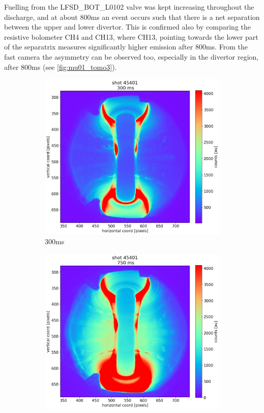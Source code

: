 Fuelling from the LFSD\_BOT\_L0102 valve was kept increasing throughout the discharge, and at about 800ms an event occurs such that there is a net separation between the upper and lower divertor. This is confirmed also by comparing the resistive bolometer CH4 and CH13, where CH13, pointing towards the lower part of the separatrix measures significantly higher emission after 800ms. From the fast camera the asymmetry can be observed too, especially in the divertor region, after 800ms (see \autoref{fig:mu01_tomo3}).
\begin{figure}
    \centering
    \begin{subfigure}{0.3\linewidth}
         \centering
         \includegraphics[trim={60 0 120 60},clip,width=\textwidth]{Chapters/chapter2/figs/45401_for_paper_300ms.png}
         \caption{300ms}
         \label{fig:mu01_tomo3a}
    \end{subfigure}
    \begin{subfigure}{0.3\linewidth}
         \centering
         \includegraphics[trim={60 0 120 60},clip,width=\textwidth]{Chapters/chapter2/figs/45401_for_paper_750ms.png}

\end{subfigure}
\end{figure}
